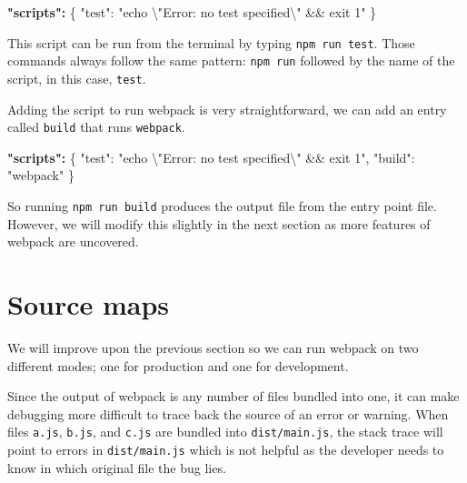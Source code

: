 \documentclass[
]{krantz}
\makeatletter
\newenvironment{Shaded}{\begin{snugshade}}{\end{snugshade}}
\newcommand{\CharTok}[1]{\textcolor[rgb]{0.5,0.5,0.5}{#1}}
\newcommand{\DataTypeTok}[1]{\textcolor[rgb]{0.27,0.27,0.27}{#1}}
\newcommand{\ErrorTok}[1]{\textcolor[rgb]{0.14,0.14,0.14}{\textbf{#1}}}
\newcommand{\FunctionTok}[1]{\textcolor[rgb]{0,0,0}{#1}}
\newcommand{\StringTok}[1]{\textcolor[rgb]{0.5,0.5,0.5}{#1}}
\newenvironment{kframe}{%
\medskip{}
\setlength{\fboxsep}{.8em}
 \def\at@end@of@kframe{}%
 \ifinner\ifhmode%
  \def\at@end@of@kframe{\end{minipage}}%
  \begin{minipage}{\columnwidth}%
 \fi\fi%
 \def\FrameCommand##1{\hskip\@totalleftmargin \hskip-\fboxsep
 \colorbox{shadecolor}{##1}\hskip-\fboxsep
     \hskip-\linewidth \hskip-\@totalleftmargin \hskip\columnwidth}%
 \MakeFramed {\advance\hsize-\width
   \@totalleftmargin\z@ \linewidth\hsize
   \@setminipage}}%
 {\par\unskip\endMakeFramed%
 \at@end@of@kframe}
\renewenvironment{Shaded}{\begin{kframe}}{\end{kframe}}
\makeatother
\begin{document}
\begin{Shaded}
\begin{Highlighting}[]
\ErrorTok{"scripts":} \FunctionTok{\{}
  \DataTypeTok{"test"}\FunctionTok{:} \StringTok{"echo }\CharTok{\textbackslash{}"}\StringTok{Error: no test specified}\CharTok{\textbackslash{}"}\StringTok{ \&\& exit 1"}
\FunctionTok{\}}
\end{Highlighting}
\end{Shaded}

This script can be run from the terminal by typing \texttt{npm\ run\ test}. Those commands always follow the same pattern: \texttt{npm\ run} followed by the name of the script, in this case, \texttt{test}.

Adding the script to run webpack is very straightforward, we can add an entry called \texttt{build} that runs \texttt{webpack}.

\begin{Shaded}
\begin{Highlighting}[]
\ErrorTok{"scripts":} \FunctionTok{\{}
  \DataTypeTok{"test"}\FunctionTok{:} \StringTok{"echo }\CharTok{\textbackslash{}"}\StringTok{Error: no test specified}\CharTok{\textbackslash{}"}\StringTok{ \&\& exit 1"}\FunctionTok{,}
  \DataTypeTok{"build"}\FunctionTok{:} \StringTok{"webpack"}
\FunctionTok{\}}
\end{Highlighting}
\end{Shaded}

So running \texttt{npm\ run\ build} produces the output file from the entry point file. However, we will modify this slightly in the next section as more features of webpack are uncovered.

\hypertarget{webpack-intro-webpack-mode}{%
\section{Source maps}\label{webpack-intro-webpack-mode}}

We will improve upon the previous section so we can run webpack on two different modes; one for production and one for development.

Since the output of webpack is any number of files bundled into one, it can make debugging more difficult to trace back the source of an error or warning. When files \texttt{a.js}, \texttt{b.js}, and \texttt{c.js} are bundled into \texttt{dist/main.js}, the stack trace will point to errors in \texttt{dist/main.js} which is not helpful as the developer needs to know in which original file the bug lies.
\end{document}
